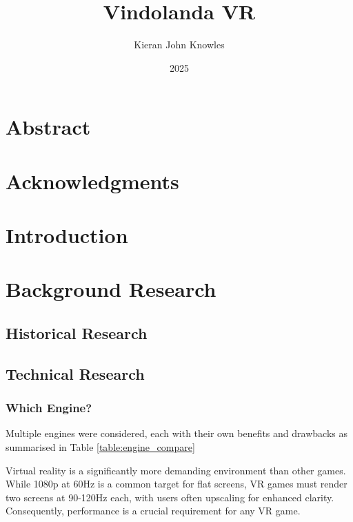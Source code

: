 \documentclass[12pt, a4paper]{report}
\title{Vindolanda VR}
\author{Kieran John Knowles}
\date{2025}
\begin{document}
\maketitle

\chapter*{Abstract}

\chapter*{Acknowledgments}

\tableofcontents
\listoftables
\listoffigures


\chapter{Introduction}

\chapter{Background Research}

\section{Historical Research}

\section{Technical Research}

\subsection{Which Engine?}

Multiple engines were considered, each with their own benefits
and drawbacks as summarised in Table \ref{table:engine_compare}

Virtual reality is a significantly more demanding environment than other games.
While 1080p at 60Hz is a common target for flat screens, VR games must render
two screens at 90-120Hz each, with users often upscaling for enhanced clarity.
Consequently, performance is a crucial requirement for any VR game.
\end{document}

